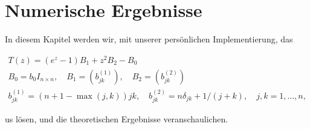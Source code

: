 \section{Numerische Ergebnisse}

In diesem Kapitel werden wir, mit unserer persönlichen Implementierung, das  

\begin{gather*}
    T(z) = (e^z - 1) B_1 + z^2 B_2 - B_0 \\
    B_0 = b_0 I_{n\times n},
    \quad
    B_1 = (b_{j k}^{(1)}),
    \quad
    B_2 = (b_{j k}^{(2)}) \\
    b_{j k}^{(1)} = (n + 1 - \max(j, k)) j k,
    \quad
    b_{j k}^{(2)} = n \delta_{j k} + 1 / (j + k),
    \quad
    j, k = 1, \dots, n,
\end{gather*}

us \cite{saad2020rational} lösen, und die theoretischen Ergebnisse veranschaulichen.
